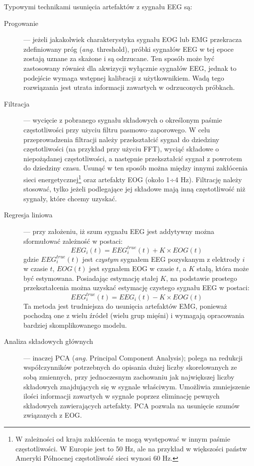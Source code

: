 \documentclass[skorowidz,skroty]{dyplomWEZUT}
\begin{document}
Typowymi technikami usunięcia artefaktów z sygnału EEG są\cite{bci_introduction}:
\begin{description}
    \item [Progowanie] --- jeżeli jakakolwiek charakterystyka sygnału EOG lub EMG przekracza zdefiniowany próg (\textit{ang.} threshold), próbki sygnałów EEG w tej epoce zostają uznane za skażone i są odrzucane. Ten sposób może być zastosowany również dla akwizycji wyłącznie sygnałów EEG, jednak to podejście wymaga wstępnej kalibracji z użytkownikiem. Wadą tego rozwiązania jest utrata informacji zawartych w odrzuconych próbkach.
    
    \item [Filtracja] --- wycięcie z pobranego sygnału składowych o określonym paśmie częstotliwości przy użyciu filtru pasmowo--zaporowego. W celu przeprowadzenia filtracji należy przekształcić sygnał do dziedziny częstotliwości (na przykład przy użyciu FFT), wyciąć składowe o niepożądanej częstotliwości, a następnie przekształcić sygnał z powrotem do dziedziny czasu. Usunąć w ten sposób można między innymi zakłócenia sieci energetycznej\footnote{W zależności od kraju zakłócenia te mogą występować w innym paśmie częstotliwości. W Europie jest to 50 Hz, ale na przykład w większości państw Ameryki Północnej częstotliwość sieci wynosi 60 Hz.} oraz artefakty EOG (około 1÷4 Hz). Filtrację należy stosować, tylko jeżeli podlegające jej składowe mają inną częstotliwość niż sygnały, które chcemy uzyskać.
    
    \item [Regresja liniowa] --- przy założeniu, iż szum sygnału EEG jest addytywny można sformułować zależność w postaci\cite{bci_introduction}:
    $$ EEG_i(t) = EEG^{true}_i(t) + K \times EOG(t) $$
    gdzie $EEG^{true}_i(t)$ jest \textit{czystym} sygnałem EEG pozyskanym z elektrody $i$ w czasie $t$, $EOG(t)$ jest sygnałem EOG w czasie $t$, a $K$ stałą, która może być estymowana. Posiadając estymację stałej $K$, na podstawie prostego przekształcenia można uzyskać estymację czystego sygnału EEG w postaci:
    $$ EEG^{true}_i(t) = EEG_i(t) - K \times EOG(t) $$
    Ta metoda jest trudniejsza do usunięcia artefaktów EMG, ponieważ pochodzą one z wielu źródeł (wielu grup mięśni) i wymagają opracowania bardziej skomplikowanego modelu.

    \item [Analiza składowych głównych] --- inaczej PCA (\textit{ang.} Principal Component Analysis); polega na redukcji współczynników potrzebnych do opisania dużej liczby skorelowanych ze sobą zmiennych, przy jednoczesnym zachowaniu jak największej liczby składowych znajdujących się w sygnale właściwym. Umożliwia zmniejszenie ilości informacji zawartych w sygnale poprzez eliminację pewnych składowych zawierających artefakty\cite{eeg_noise}. PCA pozwala na usunięcie szumów związanych z EOG\cite{bci_introduction}.
    

\end{description}
\end{document}
